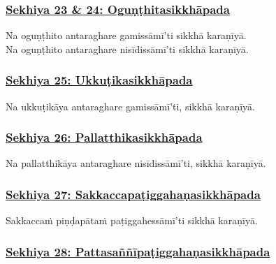 \subsubsection*{\hyperref[training23-24]{Sekhiya 23 \& 24: Oguṇṭhitasikkhāpada}}
\label{sekh23-24}

Na oguṇṭhito antaraghare gamissāmī'ti sikkhā karaṇīyā.\\
Na oguṇṭhito antaraghare nisīdissāmī'ti sikkhā karaṇīyā.



\subsubsection*{\hyperref[training25]{Sekhiya 25: Ukkuṭikasikkhāpada}}
\label{sekh25}

Na ukkuṭikāya antaraghare gamissāmī'ti, sikkhā karaṇīyā.



\subsubsection*{\hyperref[training26]{Sekhiya 26: Pallatthikasikkhāpada}}
\label{sekh26}

Na pallatthikāya antaraghare nisīdissāmī'ti, sikkhā karaṇīyā.\makeatletter\hyperlink{endnote479-appendix}\makeatother{}



\subsubsection*{\hyperref[training27]{Sekhiya 27: Sakkaccapaṭiggahaṇasikkhāpada}}
\label{sekh27}

Sakkaccaṁ piṇḍapātaṁ paṭiggahessāmī'ti sikkhā karaṇīyā.



\subsubsection*{\hyperref[training28]{Sekhiya 28: Pattasaññīpaṭiggahaṇasikkhāpada}}
\label{sekh28}

